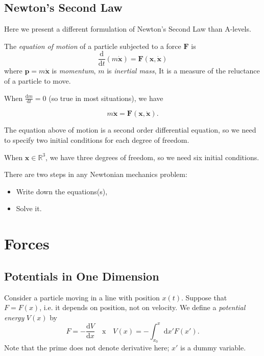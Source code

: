 \subsection{Newton's Second Law}
Here we present a different formulation of Newton's Second Law than A-levels.

\begin{definition}
    The \textit{equation of motion} of a particle subjected to a force \(\mathbf{F} \) is
    \[
        \frac{\mathrm{d}}{\mathrm{d}t} (m \dot{\mathbf{x}}) = \mathbf{F} (\mathbf{x}, \dot{\mathbf{x}})
    \]
    where \(\mathbf{p} = m \dot{\mathbf{x}}\) is \textit{momentum}, \(m\) is \textit{inertial mass}, It is a measure of the reluctance of a particle to move.
\end{definition}

When \(\frac{\mathrm{d}m}{\mathrm{d}t} = 0\) (so true in most situations), we have
\begin{theorem}
    \[
        m\ddot{\mathbf{x}} = \mathbf{F} (\mathbf{x}, \dot{\mathbf{x}}).
    \]
\end{theorem}
The equation above of motion is a second order differential equation, so we need to specify two initial conditions for each degree of freedom.

\begin{example}
    When \(\mathbf{x} \in \mathbb{R}^3\), we have three degrees of freedom, so we need six initial conditions. 
\end{example}

There are two steps in any Newtonian mechanics problem:
\begin{itemize}
    \item Write down the equations(s),
    \item Solve it.
\end{itemize}

\section{Forces}
\subsection{Potentials in One Dimension}
Consider a particle moving in a line with position \(x(t)\). Suppose that \(F = F(x)\), i.e. it depends on position, not on velocity. We define a \textit{potential energy} \(V(x)\) by
\[
    F = -\frac{\mathrm{d}V}{\mathrm{d}x} \quad \text{x} \quad V(x) = - \int_{x_0}^{x}\mathrm{d}x'F(x').
\]
Note that the prime does not denote derivative here; \(x'\) is a dummy variable.

